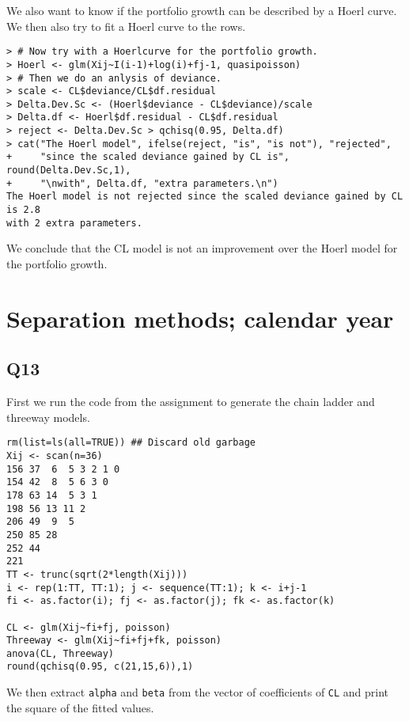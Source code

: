\documentclass[11pt]{article}
\begin{document}
We also want to know if the portfolio growth can be described by a Hoerl curve. We then also try to fit a Hoerl curve to the rows.

\begin{verbatim}
> # Now try with a Hoerlcurve for the portfolio growth.
> Hoerl <- glm(Xij~I(i-1)+log(i)+fj-1, quasipoisson)
> # Then we do an anlysis of deviance.
> scale <- CL$deviance/CL$df.residual
> Delta.Dev.Sc <- (Hoerl$deviance - CL$deviance)/scale
> Delta.df <- Hoerl$df.residual - CL$df.residual
> reject <- Delta.Dev.Sc > qchisq(0.95, Delta.df)
> cat("The Hoerl model", ifelse(reject, "is", "is not"), "rejected",
+     "since the scaled deviance gained by CL is", round(Delta.Dev.Sc,1),
+     "\nwith", Delta.df, "extra parameters.\n")
The Hoerl model is not rejected since the scaled deviance gained by CL is 2.8 
with 2 extra parameters.
\end{verbatim}

We conclude that the CL model is not an improvement over the Hoerl model for the portfolio growth.

\section{Separation methods; calendar year}

\subsection*{Q13}

First we run the code from the assignment to generate the chain ladder and threeway models.

\begin{verbatim}
rm(list=ls(all=TRUE)) ## Discard old garbage
Xij <- scan(n=36)
156 37  6  5 3 2 1 0
154 42  8  5 6 3 0
178 63 14  5 3 1
198 56 13 11 2
206 49  9  5
250 85 28
252 44
221
TT <- trunc(sqrt(2*length(Xij)))
i <- rep(1:TT, TT:1); j <- sequence(TT:1); k <- i+j-1
fi <- as.factor(i); fj <- as.factor(j); fk <- as.factor(k)

CL <- glm(Xij~fi+fj, poisson)
Threeway <- glm(Xij~fi+fj+fk, poisson)
anova(CL, Threeway)
round(qchisq(0.95, c(21,15,6)),1)
\end{verbatim}

We then extract \verb|alpha| and \verb|beta| from the vector of coefficients of \verb|CL| and print the square of the fitted values.
\end{document}
